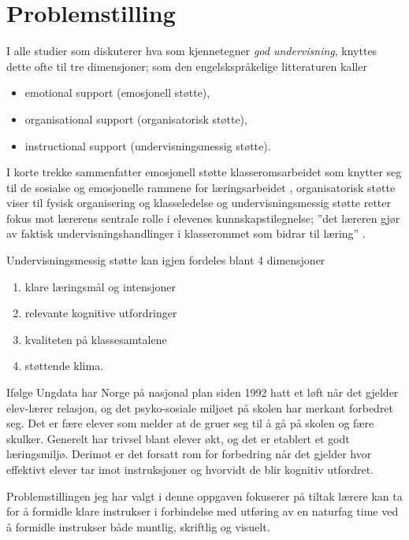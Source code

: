 \documentclass[main.tex]{subfiles}
\begin{document}
\section*{Problemstilling}    
I alle studier som diskuterer hva som kjennetegner \emph{god undervisning}, knyttes 
dette ofte til tre dimensjoner\cite[Klette 2013, side 142]{klette}; som den 
engelskspråkelige litteraturen kaller 
\begin{itemize}
\item emotional support (emosjonell støtte),
\item organisational support (organisatorisk støtte),
\item instructional support (undervisningsmessig støtte).
\end{itemize}
I korte trekke sammenfatter emosjonell støtte klasseromsarbeidet som knytter
seg til de sosialse og emosjonelle rammene for læringsarbeidet \cite[Klette 2013, side 143]{klette},
organisatorisk støtte viser til fysisk organisering og klasseledelse \cite[Klette 2013, side189]{klette}
og undervisningsmessig støtte retter fokus mot lærerens sentrale rolle i elevenes kunnskapstilegnelse; ''det 
læreren gjør av faktisk undervisningshandlinger i klasserommet som bidrar til læring'' 
\cite[Klette 2013, side 143 og 146]{klette}.
\newline

Undervisningsmessig støtte kan igjen fordeles blant 4 dimensjoner\cite[Klette 2013, side 146]{klette}
\begin{enumerate}
\item klare læringsmål og intensjoner
\item relevante kognitive utfordringer
\item kvaliteten på klassesamtalene
\item støttende klima.
\end{enumerate}

Ifølge Ungdata\cite[legg til referanse ungdata]{ungdata}\cite[Klette, side 144]{klette} har Norge på nasjonal 
plan siden 1992 hatt et løft når det gjelder elev-lærer 
relasjon, og det psyko-sosiale miljøet på skolen har merkant 
forbedret seg. Det er fære elever som melder at de gruer seg til å 
gå på skolen og fære skulker. Generelt har trivsel 
blant elever økt, og det er etablert et godt læringsmiljø. Derimot er det 
forsatt rom for forbedring når det gjelder hvor effektivt elever tar imot 
instruksjoner og hvorvidt de blir kognitiv utfordret. 
\newline

Problemstillingen jeg har valgt i denne oppgaven fokuserer på tiltak 
lærere kan ta for å formidle klare instrukser i forbindelse med utføring av en 
naturfag time ved å formidle instrukser både muntlig, skriftlig og visuelt.
\newline
\end{document}
